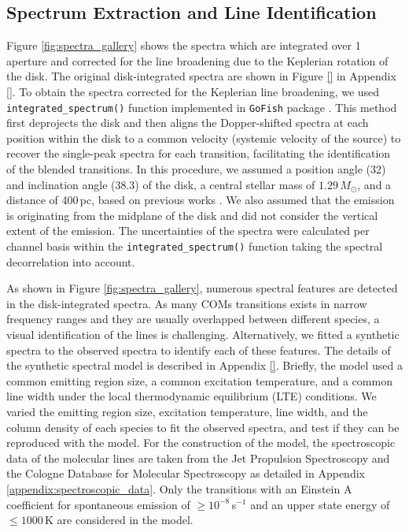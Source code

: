 \documentclass[linenumbers, twocolumn, twocolappendix, astrosymb, times]{aastex631}
\begin{document}
\subsection{Spectrum Extraction and Line Identification}\label{subsec:line_identification}
Figure \ref{fig:spectra_gallery} shows the spectra which are integrated over 1 aperture and corrected for the line broadening due to the Keplerian rotation of the disk. The original disk-integrated spectra are shown in Figure \ref{} in Appendix \ref{}. To obtain the spectra corrected for the Keplerian line broadening, we used \texttt{integrated\_spectrum()} function implemented in \texttt{GoFish} package \citep{GoFish}. This method first deprojects the disk and then aligns the Dopper-shifted spectra at each position within the disk to a common velocity (systemic velocity of the source) to recover the single-peak spectra for each transition, facilitating the identification of the blended transitions. In this procedure, we assumed a position angle (32\arcdeg) and inclination angle (38.3\arcdeg) of the disk, a central stellar mass of $1.29\,M_\odot$, and a distance of 400\,pc, based on previous works \citep{Cieza2016, Tobin2023}. We also assumed that the emission is originating from the midplane of the disk and did not consider the vertical extent of the emission. The uncertainties of the spectra were calculated per channel basis within the \texttt{integrated\_spectrum()} function taking the spectral decorrelation \citep{Yen2016} into account.

As shown in Figure \ref{fig:spectra_gallery}, numerous spectral features are detected in the disk-integrated spectra. As many COMs transitions exists in narrow frequency ranges and they are usually overlapped between different species, a visual identification of the lines is challenging. Alternatively, we fitted a synthetic spectra to the observed spectra to identify each of these features. The details of the synthetic spectral model is described in Appendix \ref{}. Briefly, the model used a common emitting region size, a common excitation temperature, and a common line width under the local thermodynamic equilibrium (LTE) conditions. We varied the emitting region size, excitation temperature, line width, and the column density of each species to fit the observed spectra, and test if they can be reproduced with the model. For the construction of the model, the spectroscopic data of the molecular lines are taken from the Jet Propulsion Spectroscopy \citep[JPL;][]{JPL} and the Cologne Database for Molecular Spectroscopy \citep[CDMS;][]{CDMS1, CDMS2, CDMS3} as detailed in Appendix \ref{appendix:spectroscopic_data}. Only the transitions with an Einstein A coefficient for spontaneous emission of $\geq10^{-8}$\,s$^{-1}$ and an upper state energy of $\leq1000$\,K are considered in the model.
\end{document}
